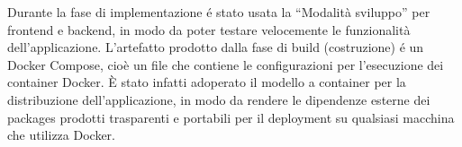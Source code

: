 Durante la fase di implementazione é stato usata la ``Modalità sviluppo'' per frontend e backend, in modo da poter testare velocemente le funzionalità dell'applicazione. L'artefatto prodotto dalla fase di build (costruzione) é un Docker Compose, cioè un file che contiene le configurazioni per l'esecuzione dei container Docker. È stato infatti adoperato il modello a container per la distribuzione dell'applicazione, in modo da rendere le dipendenze esterne dei packages prodotti trasparenti e portabili per il deployment su qualsiasi macchina che utilizza Docker.\\